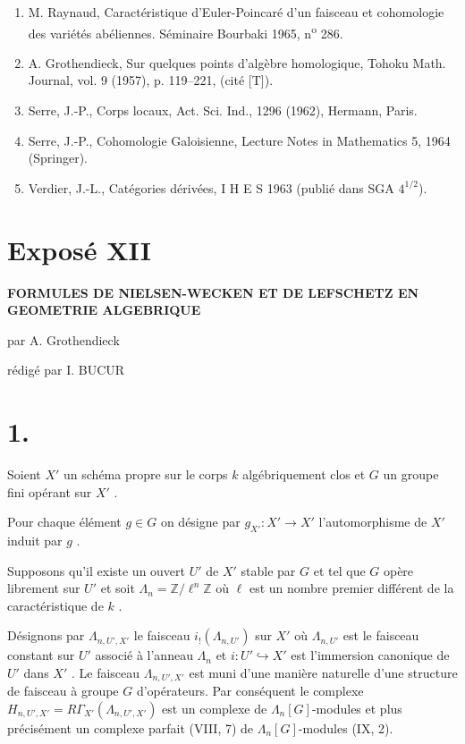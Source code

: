 \documentclass[11pt]{article}
\providecommand{\La}{\Lambda}
\providecommand{\bZ}{\mathbb Z}
\begin{document}
\begin{enumerate}
\item[{[1]}] M. Raynaud, Caractéristique d'Euler-Poincaré d'un faisceau et cohomologie des variétés abéliennes. Séminaire Bourbaki 1965, n\textsuperscript{o} 286.
\item[{[2]}] A. Grothendieck, Sur quelques points d'algèbre homologique, Tohoku Math. Journal, vol. 9 (1957), p. 119--221, (cité [T]).
\item[{[3]}] Serre, J.-P., Corps locaux, Act. Sci. Ind., 1296 (1962), Hermann, Paris.
\item[{[4]}] Serre, J.-P., Cohomologie Galoisienne, Lecture Notes in Mathematics 5, 1964 (Springer).
\item[{[5]}] Verdier, J.-L., Catégories dérivées, I H E S 1963 (publié dans SGA $4^{1/2}$).
\end{enumerate}

\section*{Exposé XII}

\begin{center}
\Large\bf FORMULES DE NIELSEN-WECKEN ET DE LEFSCHETZ EN GEOMETRIE ALGEBRIQUE
\end{center}

\begin{center}
par A. Grothendieck

rédigé par I. BUCUR
\end{center}

\bigskip

\section*{1.}
Soient $X'$ un schéma propre sur le corps $k$ algébriquement clos et $G$ un groupe fini opérant sur $X'$ .

Pour chaque élément $g \in G$ on désigne par $g_{X'} : X' \to X'$ l'automorphisme de $X'$ induit par $g$ .

Supposons qu'il existe un ouvert $U'$ de $X'$ stable par $G$ et tel que $G$ opère librement sur $U'$ et soit $\La_n = \bZ/\ell^n\bZ$ où $\ell$ est un nombre premier différent de la caractéristique de $k$ .

Désignons par $\La_{n,U',X'}$ le faisceau $i_!(\La_{n,U'})$ sur $X'$ où $\La_{n,U'}$ est le faisceau constant sur $U'$ associé à l'anneau $\La_n$ et $i : U' \hookrightarrow X'$ est l'immersion canonique de $U'$ dans $X'$ . Le faisceau $\La_{n,U',X'}$ est muni d'une manière naturelle d'une structure de faisceau à groupe $G$ d'opérateurs. Par conséquent le complexe $H_{n,U',X'} = R\Gamma_{X'}(\La_{n,U',X'})$ est un complexe de $\La_n[G]$-modules et plus précisément un complexe parfait (VIII, 7) de $\La_n[G]$-modules (IX, 2).
\end{document}
